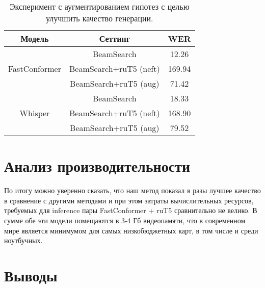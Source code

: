 \begin{table}[]
\centering
\caption{Эксперимент с аугментированием гипотез с целью улучшить качество генерации.}
\begin{tabular}{|c|c|c|}
\hline
Модель                         & Сеттинг                              & WER     \\ \hline
\multirow{3}{*}{FastConformer} & BeamSearch                           & 12.26   \\ \cline{2-3} 
                               & BeamSearch+ruT5 (neft)               & 169.94  \\ \cline{2-3} 
                               & BeamSearch+ruT5 (aug)                & 71.42   \\ \hline
\multirow{3}{*}{Whisper}       & BeamSearch                           & 18.33   \\ \cline{2-3} 
                               & BeamSearch+ruT5 (neft)               & 168.90  \\ \cline{2-3} 
                               & BeamSearch+ruT5 (aug)                & 79.52   \\ \hline
\end{tabular}
\label{tab:fails}
\end{table}

\section{Анализ производительности}
По итогу можно уверенно сказать, что наш метод показал в разы лучшее качество в сравнение с другими методами и при этом затраты вычислительных ресурсов, требуемых для inference пары FastConformer + ruT5 сравнительно не велико.
В сумме обе эти модели помещаются в 3-4 Гб видеопамяти, что в современном мире является минимумом для самых низкобюджетных карт, в том числе и среди ноутбучных.

\section{Выводы}
